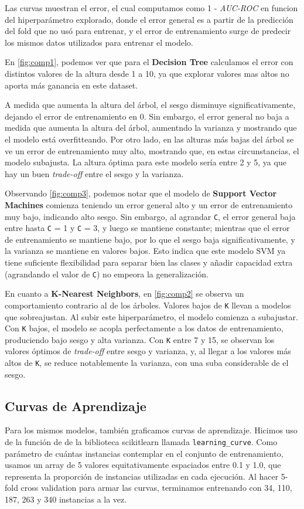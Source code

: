 Las curvas muestran el error, el cual computamos como 1 - \textit{AUC-ROC} en funcion del hiperparámetro explorado, donde 
el error general es a partir de la predicción del fold que no usó para entrenar, y el error de entrenamiento surge de predecir los mismos datos
utilizados para entrenar el modelo.

En \ref{fig:comp1}, podemos ver que para el \textbf{Decision Tree} calculamos el error con distintos valores de la altura desde 1 a 10, ya que explorar valores mas altos no aporta
más ganancia en este dataset.

A medida que aumenta la altura del árbol, el sesgo disminuye significativamente, dejando el error de entrenamiento en 0. Sin 
embargo, el error general no baja a medida que aumenta la altura del árbol, aumentndo la varianza y mostrando que el modelo está 
overfitteando. Por otro lado, en las alturas más bajas del árbol se ve un error de entrenamiento muy alto, mostrando que, en estas
circunstancias, el modelo subajusta. La altura óptima para este modelo sería entre 2 y 5, ya que hay un buen \textit{trade-off} entre
el sesgo y la varianza.

Observando \ref{fig:comp3}, podemos notar que el modelo de \textbf{Support Vector Machines} comienza teniendo un error general alto y un error de entrenamiento muy bajo,
indicando alto sesgo. Sin embargo, al agrandar \texttt{C}, el error general baja entre hasta \texttt{C} = 1 y \texttt{C} = 3, y luego se mantiene constante; mientras que el error
de entrenamiento se mantiene bajo, por lo que el sesgo baja significativamente, y la varianza se mantiene en valores bajos.
Esto indica que este modelo SVM ya tiene suficiente flexibilidad para separar bien las clases y añadir capacidad extra (agrandando el valor de \texttt{C}) no empeora la generalización.

En cuanto a \textbf{K-Nearest Neighbors}, en \ref{fig:comp2} se observa un comportamiento contrario al de los árboles. Valores bajos de \texttt{K} llevan a modelos que sobreajustan. Al subir este hiperparámetro, 
el modelo comienza a subajustar. Con \texttt{K} bajos, el modelo se acopla perfectamente a los datos de entrenamiento,
produciendo bajo sesgo y alta varianza. Con \texttt{K} entre 7 y 15, se observan los valores óptimos de  \textit{trade-off} entre sesgo y varianza,
y, al llegar a los valores más altos de \texttt{K}, se reduce notablemente la varianza, con una suba considerable de el sesgo.


\subsection*{Curvas de Aprendizaje}
Para los mismos modelos, también graficamos curvas de aprendizaje. Hicimos uso de la función de de la biblioteca scikitlearn llamada \texttt{learning\_curve}. Como parámetro de cuántas instancias contemplar en el conjunto de entrenamiento, usamos un array de 5 valores equitativamente espaciados entre 0.1 y 1.0, que representa la proporción de instancias utilizadas en cada ejecución. Al hacer 5-fold cross validation para armar las curvas, terminamos entrenando con 34, 110, 187, 263 y 340 instancias a la vez.

